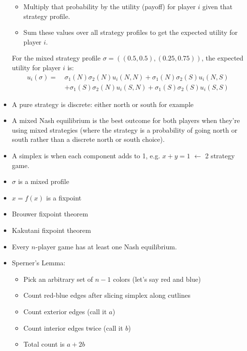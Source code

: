 \documentclass{article}
\begin{document}
\begin{itemize}
\begin{itemize}
      \item Multiply that probability by the utility (payoff) for player $i$ given that strategy profile.
      \item Sum these values over all strategy profiles to get the expected utility for player $i$.
    \end{itemize}
  For the mixed strategy profile $\sigma = ((0.5, 0.5), (0.25, 0.75))$, the expected utility for player $i$ is:
  \begin{align*}
      u_i(\sigma) =\ &\sigma_1(N)\sigma_2(N)u_i(N, N) + \sigma_1(N)\sigma_2(S)u_i(N, S) \\
  &+ \sigma_1(S)\sigma_2(N)u_i(S, N) + \sigma_1(S)\sigma_2(S)u_i(S, S)
  \end{align*}
  
  \item A pure strategy is discrete: either north or south for example
  \item A mixed Nash equilibrium is the best outcome for both players when they're using mixed strategies (where the strategy is a probability of going north or south rather than a discrete north or south choice).
  \item A simplex is when each component adds to 1, e.g. $x+y=1$ $\leftarrow$ 2 strategy game.
  \item $\sigma$ is a mixed profile
  \item $x=f(x)$ is a fixpoint
  \item Brouwer fixpoint theorem
  \item Kakutani fixpoint theorem
  \item Every $n$-player game has at least one Nash equilibrium.
  \item Sperner's Lemma:
    \begin{itemize}
      \item Pick an arbitrary set of $n-1$ colors (let’s say red and blue)
      \item Count red-blue edges after slicing simplex along cutlines
      \item Count exterior edges (call it $a$)
      \item Count interior edges twice (call it $b$)
      \item Total count is $a + 2b$
    \end{itemize}
\end{itemize}

\newpage
\end{document}
